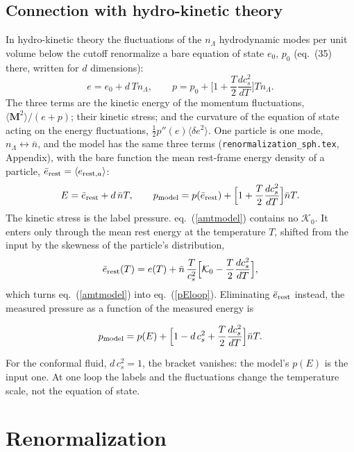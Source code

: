 \documentclass[11pt,aps,preprint,nofootinbib,superscriptaddress,tightenlines]{revtex4-2}
\newcommand{\avg}[1]{\langle #1\rangle}
\def\st{\begin{equation}}
\def\stp{\end{equation}}
\def\Eq#1{eq.~(\ref{#1})}
\begin{document}
\subsection{Connection with hydro-kinetic theory}
\label{sec:amt}

In hydro-kinetic theory \cite{amt} the fluctuations of the $n_\Lambda$ hydrodynamic modes per unit volume below the cutoff renormalize a bare equation of
state $e_0$, $p_0$ (eq.~(35) there, written for $d$ dimensions):
\st
e=e_0+d\,Tn_\Lambda,\qquad p=p_0+\Big[1+\frac T2\frac{dc_s^2}{dT}\Big]Tn_\Lambda .
\label{amt35}
\stp
The three terms are the kinetic energy of the momentum fluctuations, $\avg{\bm M^2}/(e+p)$; their kinetic stress; and the curvature of the equation of state
acting on the energy fluctuations, $\tfrac12p''(e)\avg{\delta e^2}$.  One particle is one mode, $n_\Lambda\leftrightarrow\bar n$, and the model has the same three
terms (\nolinkurl{renormalization_sph.tex}, Appendix), with the bare function the mean rest-frame energy density of a particle, $\bar e_{\rm rest}=\avg{e_{{\rm rest},a}}$:
\st
E=\bar e_{\rm rest}+d\,\bar nT,\qquad p_{\rm model}=p(\bar e_{\rm rest})+\Big[1+\frac T2\frac{dc_s^2}{dT}\Big]\bar nT .
\label{amtmodel}
\stp
The kinetic stress is the label pressure.  \Eq{amtmodel} contains no $\mathcal K_0$.  It enters only through the mean rest energy at the temperature $T$,
shifted from the input by the skewness of the particle's distribution,
\st
\bar e_{\rm rest}(T)=e(T)+\bar n\,\frac T{c_s^2}\Big[\mathcal K_0-\frac T2\frac{dc_s^2}{dT}\Big] ,
\stp
which turns \Eq{amtmodel} into \Eq{pEloop}.  Eliminating $\bar e_{\rm rest}$ instead, the measured pressure as a function of the measured energy is
\begin{keyeq}
\st
p_{\rm model}=p(E)+\Big[1-d\,c_s^2+\frac T2\frac{dc_s^2}{dT}\Big]\bar nT .
\label{PofE}
\stp
\end{keyeq}
For the conformal fluid, $d\,c_s^2=1$, the bracket vanishes: the model's $p(E)$ is the input one.  At one loop the labels and the fluctuations change the
temperature scale, not the equation of state.

\section{Renormalization}
\label{sec:ren}
\end{document}
